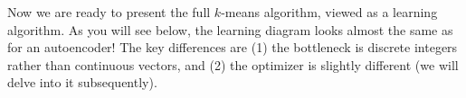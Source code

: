Now we are ready to present the full $k$-means algorithm, viewed as a learning algorithm. As you will see below, the learning diagram looks almost the same as for an autoencoder! The key differences are (1) the bottleneck is discrete integers rather than continuous vectors, and (2) the optimizer is slightly different (we will delve into it subsequently).%






